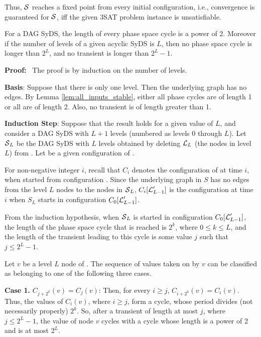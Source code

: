 \smallskip
Thus, $\mbox{$\mathcal{S}$}$ reaches a fixed point from every initial configuration, 
i.e.,  convergence is guaranteed for $\mbox{$\mathcal{S}$}$,
iff the given 3SAT problem instance is unsatisfiable.
\QED
\fi

\begin{theorem}\label{thm:levels_phase_space}
For a DAG SyDS,
the length of every phase space cycle is a power of 2.
Moreover if the number of levels of a given acyclic SyDS is $L$,
then no phase space cycle is longer than $2^L$,
and no transient is longer than $2^L-1$.
\end{theorem}

\noindent
\textbf{Proof:}~ 
The proof is by induction on the number of levels.

{\bf Basis}: Suppose that there is only one level.
Then the underlying  graph has no edges.
By Lemma \ref{lem:all_inputs_stable},
either all phase cycles are of length 1 or all are of length 2. 
Also, no transient is of length greater than 1.

{\bf Induction Step}: Suppose that the result holds for a given value of $L$,
and consider a DAG SyDS \cals{} with $L+1$ levels (numbered as levels 0 through $L$).
Let $\mbox{$\mathcal{S}$}_L$ be the DAG SyDS with $L$ levels obtained 
by deleting $\mbox{$\mathcal{L}$}_L$ (the nodes in level $L$) from \cals{}.
Let \calc{} be a given configuration of \cals{}.

For non-negative integer $i$, 
recall that $C_i$ denotes the configuration of \cals{} at time $i$, 
when started from configuration \calc{}.
Since the underlying graph in $S$ has 
no edges from the level $L$ nodes to the nodes in $\mbox{$\mathcal{S}$}_L$,
$C_i[\mbox{$\mathcal{L}$}_{L-1}']$ is the configuration at time $i$ 
when $S_L$ starts in configuration $C_0[\mbox{$\mathcal{L}$}_{L-1}']$.

From the induction hypothesis, 
when $\mbox{$\mathcal{S}$}_L$  is started in configuration $C_0[\mbox{$\mathcal{L}$}_{L-1}']$,
the length of the phase space cycle that is reached is $2^k$, where $0 \leq k \leq L$,
and the length of the transient leading to this cycle is some value $j$ such that $j \leq 2^L-1$.

Let $v$ be a level $L$ node of \cals{}.
The sequence of values taken on by $v$ 
can be classified as belonging to one of the following three cases.

{\bf Case 1.} $C_{j+2^k}(v) = C_j(v)$:
Then, for every $i \geq j$, $C_{i+2^k}(v) = C_i(v)$.
Thus, the values of $C_i(v)$, where $i \geq j$, form a cycle, 
whose period divides (not necessarily properly) $2^k$.
So, after a transient of length at most $j$, where $j \leq 2^L-1$,
the value of node $v$ cycles with a cycle whose length is a power of 2 and is at most $2^L$.

